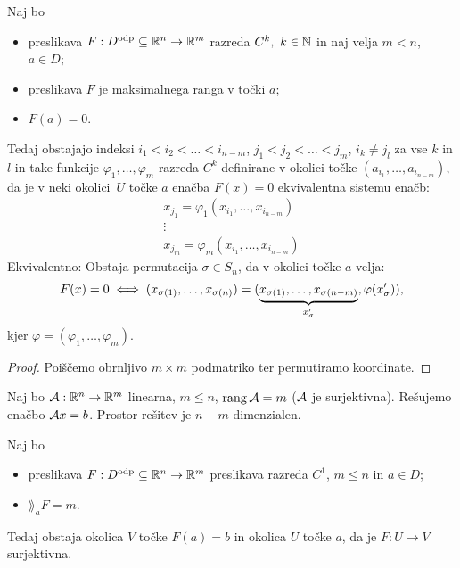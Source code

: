 \begin{posledica}
    \label{posl:permutacija}
    Naj bo 
    \begin{itemize}
        \item preslikava $F: D^\text{odp} \subseteq \mathbb{R}^n \to \mathbb{R}^m$ razreda $C^k, \ k \in \mathbb{N}$ in naj velja $m < n$, \(a \in D\);
        \item preslikava $F$ je maksimalnega ranga v točki $a$;
        \item \(F(a) =0\).
    \end{itemize}
    Tedaj obstajajo indeksi $i_1 < i_2 < \ldots < i_{n-m}$, $j_1 < j_2 < \ldots <j_m$, $i_k \neq j_l$ za vse $k$ in $l$ in take funkcije $\varphi_1, \ldots, \varphi_m$ razreda $C^k$ definirane v okolici točke $(a_{i_1}, \ldots, a_{i_{n-m}})$, da je v neki okolici~$U$ točke $a$ enačba $F(x) = 0$ ekvivalentna sistemu enačb: 
    \begin{align*}
        x_{j_1} = \varphi_1(x_{i_1}, \ldots, x_{i_{n-m}}) \\
        \vdots \\
        x_{j_m} = \varphi_m(x_{i_1}, \ldots, x_{i_{n-m}})
    \end{align*}
    Ekvivalentno: Obstaja permutacija $\sigma \in S_n$, da v okolici točke $a$ velja:
    $$F(x) = 0 \iff (x_{\sigma(1)}, \ldots, x_{\sigma(n)}) = (\underbrace{x_{\sigma(1)}, \ldots, x_{\sigma(n-m)}}_{x_\sigma'}, \varphi(x_\sigma')),$$
    kjer \(\varphi = (\varphi_1, \ldots, \varphi_m)\).
\end{posledica}

\begin{proof}
    Poiščemo obrnljivo \(m \times m\) podmatriko ter permutiramo koordinate. 
\end{proof}

\begin{primer}
    Naj bo $\mathcal{A}: \mathbb{R}^n \to \mathbb{R}^m$ linearna, $m \leq n$, $\operatorname{rang} \mathcal{A} = m$ ($\mathcal{A}$ je surjektivna). Rešujemo enačbo $\mathcal{A}x=b$. Prostor rešitev je $n-m$ dimenzialen.
\end{primer}

\begin{posledica}
    Naj bo 
    \begin{itemize}
        \item preslikava $F: D^\text{odp} \subseteq \mathbb{R}^n \to \mathbb{R}^m$ preslikava razreda $C^1$, $m \leq n$ in \(a \in D\);
        \item $\rang_aF=m$.
    \end{itemize}
    Tedaj obstaja okolica $V$ točke $F(a) = b$ in okolica $U$ točke $a$, da je $F: U \to V$ surjektivna.
\end{posledica}

